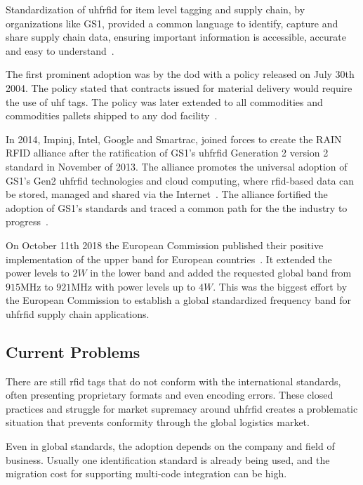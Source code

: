 Standardization of \ac{uhfrfid} for item level tagging and supply chain, by organizations like GS1, provided a common language to identify, capture and share supply chain data, ensuring important information is accessible, accurate and easy to understand~\cite{anonymousStandardsGS12014}.

The first prominent adoption was by the \ac{dod} with a policy released on July 30th 2004. The policy stated that contracts issued for material delivery would require the use of \ac{uhf} tags. The policy was later extended to all commodities and commodities pallets shipped to any \ac{dod} facility~\cite{DoDSuppliersPassive, DODReleasesFinal}.

In 2014, Impinj, Intel, Google and Smartrac, joined forces to create the RAIN RFID alliance after the ratification of GS1's \ac{uhfrfid} Generation 2 version 2 standard in November of 2013. The alliance promotes the universal adoption of GS1's Gen2 \ac{uhfrfid} technologies and cloud computing, where \ac{rfid}-based data can be stored, managed and shared via the Internet~\cite{WhatRAINRFID}.
The alliance fortified the adoption of GS1's standards and traced a common path for the the industry to progress~\cite{TechnologyCompaniesCreate}.

On October 11th 2018 the European Commission published their positive implementation of the upper band for European countries~\cite{302208v030101pPdf}.
It extended the power levels to $2W$ in the lower band and added the requested global band from $915$MHz to $921$MHz with power levels up to $4W$. 
This was the biggest effort by the European Commission to establish a global standardized frequency band for \ac{uhfrfid} supply chain applications.

\subsection{Current Problems} \label{sec:currentproblems}

There are still \ac{rfid} tags that do not conform with the international standards, often presenting proprietary formats and even encoding errors.
These closed practices and struggle for market supremacy around \ac{uhfrfid} creates a problematic situation that prevents conformity through the global logistics market.

Even in global standards, the adoption depends on the company and field of business. Usually one identification standard is already being used, and the migration cost for supporting multi-code integration can be high.

